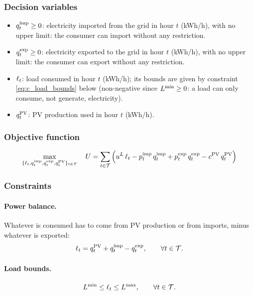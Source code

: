 \subsubsection{Decision variables}
\begin{itemize}
    \item $q^{\mathrm{imp}}_{t} \geq 0$: electricity imported from the grid in hour $t$ (kWh/h), with no
    upper limit: the consumer can import without any restriction.
    \item $q^{\mathrm{exp}}_{t} \geq 0$: electricity exported to the grid in hour $t$ (kWh/h), with no
    upper limit: the consumer can export without any restriction.
    \item $\ell_{t}$: load consumed in hour $t$ (kWh/h); its bounds are given by constraint
    \eqref{eq:c_load_bounds} below (non-negative since $L^{\min} \geq 0$: a load can only
    consume, not generate, electricity).
    \item $q^{\mathrm{PV}}_{t}$: PV production used in hour $t$ (kWh/h).
\end{itemize}

\subsubsection{Objective function}
\begin{equation}
    \max_{\{\ell_{t}, q^{\mathrm{imp}}_{t}, q^{\mathrm{exp}}_{t}, q^{\mathrm{PV}}_{t}\}_{t \in \mathcal{T}}} \quad
    U = \sum_{t \in \mathcal{T}} \Big( u^{L} \, \ell_{t} - p^{\mathrm{imp}}_{t} \, q^{\mathrm{imp}}_{t} + p^{\mathrm{exp}}_{t} \, q^{\mathrm{exp}}_{t} - c^{\mathrm{PV}} \, q^{\mathrm{PV}}_{t} \Big)
    \label{eq:daily_net_utility}
\end{equation}

\subsubsection{Constraints}

\paragraph{Power balance.}
Whatever is consumed has to come from PV production or from imports, minus whatever is
exported:
\begin{equation}
    \ell_{t} = q^{\mathrm{PV}}_{t} + q^{\mathrm{imp}}_{t} - q^{\mathrm{exp}}_{t}, \qquad \forall t \in \mathcal{T}. \label{eq:c_balance}
\end{equation}

\paragraph{Load bounds.}
\begin{equation}
    L^{\min} \leq \ell_{t} \leq L^{\max}, \qquad \forall t \in \mathcal{T}. \label{eq:c_load_bounds}
\end{equation}

